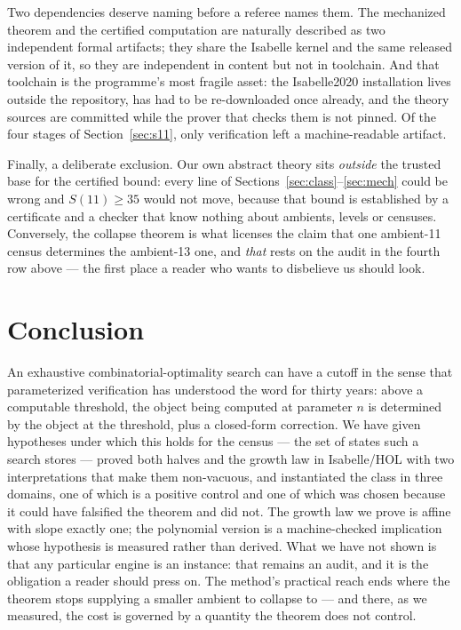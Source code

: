 \documentclass[11pt,a4paper]{article}
\theoremstyle{plain}
\theoremstyle{definition}
\theoremstyle{remark}
\begin{document}
Two dependencies deserve naming before a referee names them. The mechanized
theorem and the certified computation are naturally described as two
independent formal artifacts; they share the Isabelle kernel and the same
released version of it, so they are independent in content but not in
toolchain. And that toolchain is the programme's most fragile asset: the
Isabelle2020 installation lives outside the repository, has had to be
re-downloaded once already, and the theory sources are committed while the
prover that checks them is not pinned. Of the four stages of
Section~\ref{sec:s11}, only verification left a machine-readable artifact.

Finally, a deliberate exclusion. Our own abstract theory sits \emph{outside}
the trusted base for the certified bound: every line of
Sections~\ref{sec:class}--\ref{sec:mech} could be wrong and $S(11) \ge 35$
would not move, because that bound is established by a certificate and a
checker that know nothing about ambients, levels or censuses. Conversely, the
collapse theorem is what licenses the claim that one ambient-11 census
determines the ambient-13 one, and \emph{that} rests on the audit in the fourth
row above --- the first place a reader who wants to disbelieve us should look.

\section{Conclusion}

An exhaustive combinatorial-optimality search can have a cutoff in the sense
that parameterized verification has understood the word for thirty years: above
a computable threshold, the object being computed at parameter $n$ is
determined by the object at the threshold, plus a closed-form correction. We
have given hypotheses under which this holds for the census --- the set of
states such a search stores --- proved both halves and the growth law in
Isabelle/HOL with two interpretations that make them non-vacuous, and
instantiated the class in three domains, one of which is a positive control and
one of which was chosen because it could have falsified the theorem and did
not. The growth law we prove is affine with slope exactly one; the polynomial
version is a machine-checked implication whose hypothesis is measured rather
than derived. What we have not shown is that any particular engine is an
instance: that remains an audit, and it is the obligation a reader should press
on. The method's practical reach ends where the theorem stops supplying a
smaller ambient to collapse to --- and there, as we measured, the cost is
governed by a quantity the theorem does not control.

\footnotesize


\end{document}
